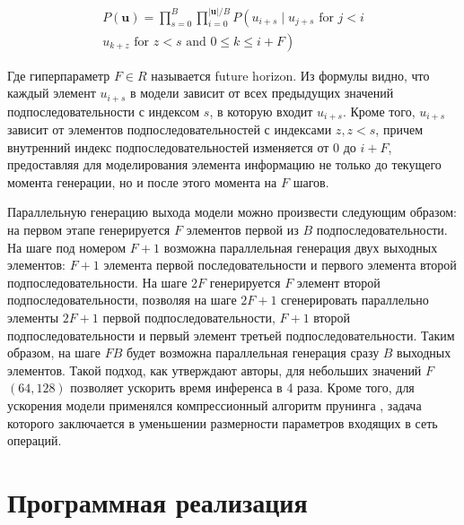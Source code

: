 \documentclass[oneside,final,14pt]{extreport}
\begin{document}
\begin{equation}
\begin{array}{r}
P(\mathbf{u})=\prod_{s=0}^{B} \prod_{i=0}^{|\mathbf{u}| / B} P\left(u_{ i+s} \mid u_{ j+s} \text { for } j<i\right. \\
\left.u_{ k+z} \text { for } z<s \text { and } 0 \leq k \leq i + F \right)
\end{array}
\end{equation}

Где гиперпараметр $F \in R$ называется future horizon.  Из формулы видно, что каждый элемент $u_{i + s}$ в модели зависит от всех предыдущих значений подпоследовательности с индексом $s$, в которую входит $u_{i + s}$. Кроме того, $u_{i+s}$ зависит от элементов подпоследовательностей с индексами $z, z < s$, причем внутренний индекс подпоследовательностей изменяется от $0$ до $i+F$, предоставляя для моделирования элемента информацию не только до текущего момента генерации, но и после этого момента на $F$ шагов.  

Параллельную генерацию выхода модели можно произвести следующим образом: на первом этапе генерируется $F$ элементов первой из $B$ подпоследовательности. На шаге под номером $F+1$ возможна параллельная генерация двух выходных элементов: $F+1$ элемента первой последовательности и первого элемента второй подпоследовательности. На шаге $2F$ генерируется $F$ элемент второй подпоследовательности, позволяя на шаге $2F+1$ сгенерировать параллельно элементы $2F + 1$ первой подпоследовательности, $F+1$ второй подпоследовательности и первый элемент третьей подпоследовательности. Таким образом, на шаге $FB$ будет возможна параллельная генерация сразу $B$  выходных элементов. Такой подход, как утверждают авторы, для небольших значений $F$ $(64, 128)$ позволяет ускорить время инференса в 4 раза\cite{bib:waveRNN}. Кроме того, для ускорения модели применялся компрессионный алгоритм прунинга \cite{bib:waveRNN}, задача которого заключается в уменьшении размерности параметров входящих в сеть операций.

  \iffalse
 Архив:
Вектора контекста используются для дополнительной параметризации модели, позволяя кодировать информацию об спикере или какую-либо другую информацию.
WaweNet


HIFI-Gun

Spect2wav

Cargan
\fi

\chapter{Программная реализация}
\end{document}
